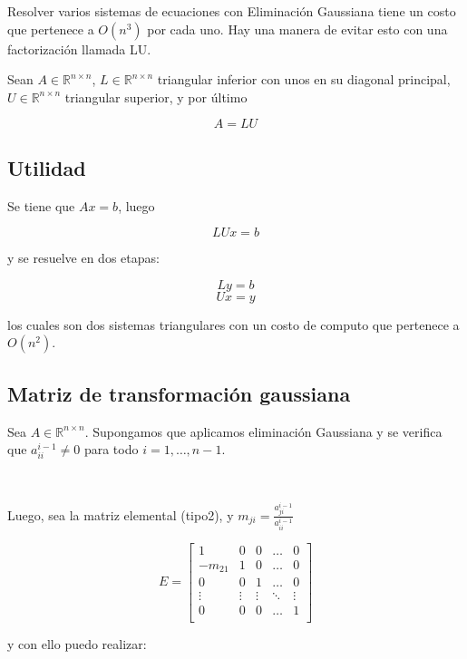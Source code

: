 
Resolver varios sistemas de ecuaciones con Eliminación Gaussiana tiene un costo que pertenece a $O(n^3)$ por cada uno. Hay una manera de evitar esto con una factorización llamada LU.

Sean $A \in \mathbb{R}^{n \times n}$, $L \in \mathbb{R}^{n \times n}$ triangular inferior con unos en su diagonal principal, $U \in \mathbb{R}^{n \times n}$ triangular superior, y por último 

\[A = LU\]

\subsection{Utilidad}\label{subsec:utilidad_lu}

Se tiene que $Ax = b$, luego

\[LUx = b\]

y se resuelve en dos etapas:

\[Ly = b\]
\[Ux = y\]

los cuales son dos sistemas triangulares con un costo de computo que pertenece a $O(n^2)$.

\subsection{Matriz de transformación gaussiana}\label{subsec:matriz_de_transformacion_gaussiana}

Sea $A \in \mathbb{R}^{n \times n}$. Supongamos que aplicamos eliminación Gaussiana y se verifica que $a_{ii}^{i - 1}  \neq 0$ para todo $i = 1,\ldots,n-1$.

\

Luego, sea la matriz elemental (tipo2), y $m_{ji} = \frac{a_{ji}^{i-1}}{a_{ii}^{i-1}}$

\[
E = 
\begin{bmatrix}
1 & 0 & 0 & \ldots & 0 \\
-m_{21} & 1 & 0 & \ldots & 0 \\
0 & 0 & 1 & \ldots & 0 \\
\vdots & \vdots & \vdots & \ddots & \vdots \\
0 & 0 & 0 & \ldots & 1 \\
\end{bmatrix}
\]

y con ello puedo realizar:

